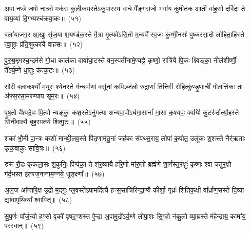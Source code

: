 {\anuvakamend[{म॒युस्त्रयो॑विꣳशतिः}]}%

अ॒पां नप्त्रे॑ ज॒षो ना॒क्रो मक॑रः कुली॒कय॒स्ते\-ऽकू॑पारस्य वा॒चे पै᳚ङ्गरा॒जो भगा॑य कु॒षीत॑क आ॒ती वा॑ह॒सो दर्वि॑दा॒ ते वा॑य॒व्या॑ दि॒ग्भ्यश्च॑क्रवा॒कः॥~(५१)\ip

{\anuvakamend[{अ॒पामेका॒न्नविꣳ॑शतिः}]}%

बला॑याजग॒र आ॒खुः सृ॑ज॒या श॒यण्ड॑क॒स्ते मै॒त्रा मृ॒त्यवे॑\-ऽसि॒तो म॒न्यवे᳚ स्व॒जः कु॑म्भी॒नसः॑ पुष्करसा॒दो लो॑हिता॒हिस्ते त्वा॒ष्ट्राः प्र॑ति॒श्रुत्का॑यै वाह॒सः॥~(५२)\ip

{\anuvakamend[{}]}

पु॒रु॒ष॒मृ॒गश्च॒न्द्रम॑से गो॒धा काल॑का दार्वाघा॒टस्ते वन॒स्पती॑नामे॒ण्यह्ने॒ कृष्णो॒ रात्रि॑यै पि॒कः क्ष्विङ्का॒ नील॑शीर्ष्णी॒ ते᳚\-ऽर्य॒म्णे धा॒तुः क॑त्क॒टः॥~(५३)\ip

{\anuvakamend[{}]}

सौ॒री ब॒लाकर्श्यो॑ म॒यूरः॑ श्ये॒नस्ते ग॑न्ध॒र्वाणां॒ वसू॑नां क॒पिञ्ज॑लो रु॒द्राणां᳚ तित्ति॒री रो॒हित्कु॑ण्डृ॒णाची॑ गो॒लत्ति॑का॒ ता अ॑फ्स॒रसा॒मर॑ण्याय सृम॒रः॥~(५४)\ip

{\anuvakamend[{}]}

पृ॒ष॒तो वै᳚श्वदे॒वः पि॒त्वो न्यङ्कुः॒ कश॒स्ते\-ऽनु॑मत्या अन्यवा॒पो᳚\-ऽर्धमा॒सानां᳚ मा॒सां क॒श्यपः॒ क्वयिः॑ कु॒टरु॑र्दात्यौ॒हस्ते सि॑नीवा॒ल्यै बृह॒स्पत॑ये शित्पु॒टः॥~(५५)\ip

{\anuvakamend[{}]}

शका॑ भौ॒मी पा॒न्त्रः कशो॑ मान्थी॒लव॒स्ते पि॑तृ॒णामृ॑तू॒नां जह॑का संवथ्स॒राय॒ लोपा॑ क॒पोत॒ उलू॑कः श॒शस्ते नैर्॑\mbox{}ऋताः कृ॑क॒वाकुः॑ सावि॒त्रः॥~(५६)\ip

{\anuvakamend[{बला॑य पुरुषमृ॒गः सौ॒री पृ॑ष॒तः शका॒ष्टाद॑शा॒ष्टाद॑श}]}%

रुरू॑ रौ॒द्रः कृ॑कला॒सः श॒कुनिः॒ पिप्प॑का॒ ते श॑र॒व्या॑यै हरि॒णो मा॑रु॒तो ब्रह्म॑णे शा॒र्गस्त॒रक्षुः॑ कृ॒ष्णः श्वा च॑तुर॒क्षो ग॑र्द॒भस्त इ॑तरज॒नाना॑म॒ग्नये॒ धूङ्क्ष्णा᳚॥~(५७)\ip

{\anuvakamend[{रुरु॑र्विꣳश॒तिः}]}%

अ॒ल॒ज आ᳚न्तरि॒क्ष उ॒द्रो म॒द्गुः प्ल॒वस्ते॑\-ऽपामदि॑त्यै हꣳस॒साचि॑रिन्द्रा॒ण्यै कीर्\mbox{}शा॒ गृध्रः॑ शितिक॒क्षी वा᳚र्ध्राण॒सस्ते दि॒व्या द्या॑वापृथि॒व्या᳚ श्वा॒वित्॥~(५८)\ip

{\anuvakamend[{}]}

सु॒प॒र्णः पा᳚र्ज॒न्यो ह॒ꣳ॒सो वृको॑ वृषद॒ꣳ॒शस्त ऐ॒न्द्रा अ॒पामु॒द्रो᳚\-ऽर्य॒म्णे लो॑पा॒शः सि॒ꣳ॒हो न॑कु॒लो व्या॒घ्रस्ते म॑हे॒न्द्राय॒ कामा॑य॒ पर॑स्वान्॥~(५९)\ip

